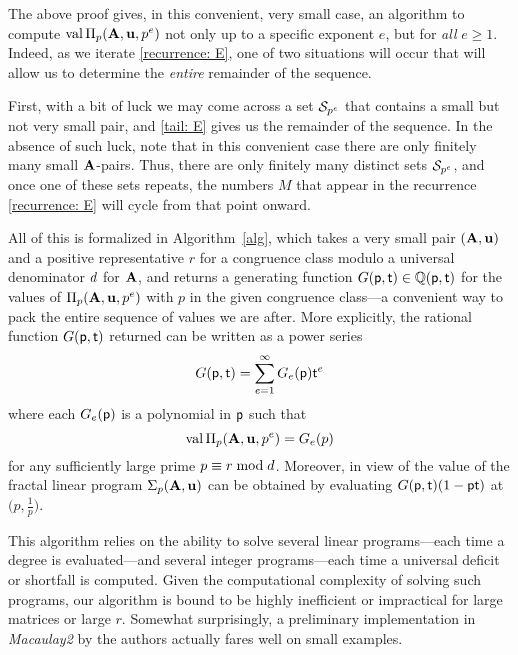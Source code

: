\documentclass{article}
\begin{document}
\begin{remark}[An algorithm]
   \label{convenient algorithm: R}
   The above proof gives, in this convenient, very small case, an algorithm to compute $\val\IP_p(\matA,\vv{u},p^e)$ not only up to a specific exponent $e$, but for \emph{all} $e \ge 1$.
   Indeed, as we iterate \eqref{recurrence: E}, one of two situations will occur that will allow us to determine the \emph{entire} remainder of the sequence.

   First, with a bit of luck we may come across a set $\S_{p^e}$ that contains a small but not very small pair, and \eqref{tail: E} gives us the remainder of the sequence.
   In the absence of such luck, note that in this convenient case there are only finitely many small $\matA$-pairs.
   Thus, there are only finitely many distinct sets $\S_{p^e}$, and once one of these sets repeats, the numbers $M$ that appear in the recurrence \eqref{recurrence: E} will cycle from that point onward.

   All of this is formalized in Algorithm~\ref{alg}, which takes a very small pair $(\matA,\vv{u})$ and a positive representative $r$ for a congruence class modulo a universal denominator $\denom$ for $\matA$, and returns a generating function $G(\pp,\tt) \in \QQ(\pp,\tt)$ for the values of $\IP_p(\matA,\vv{u},p^e)$ with $p$ in the given congruence class---a convenient way to pack the entire sequence of values we are after.
   More explicitly, the rational function $G(\pp,\tt)$ returned can be written as a power series
   \[G(\pp,\tt) = \sum_{e=1}^\infty G_e(\pp)\tt^e\]
   where each $G_e(\pp)$ is a polynomial in $\pp$ such that
   \[ \val \IP_p(\matA,\vv{u},p^e) = G_e(p)\]
   for any sufficiently large prime $p\equiv r\bmod \denom$.
   Moreover, in view of  the value of the fractal linear program $\fip_p(\matA,\vv{u})$ can be obtained by evaluating $G(\pp,\tt)(1-\pp\tt)$ at $\big(p,\frac1p\big)$.

  This algorithm relies on the ability to solve several linear programs---each time a degree is evaluated---and several integer programs---each time a universal deficit or shortfall is computed.
   Given the computational complexity of solving such programs, our algorithm is bound to be highly inefficient or impractical for large matrices or large $r$.
   Somewhat surprisingly, a preliminary implementation in \emph{Macaulay2} \cite{M2} by the authors actually fares well on small examples.
\end{remark}
\end{document}

